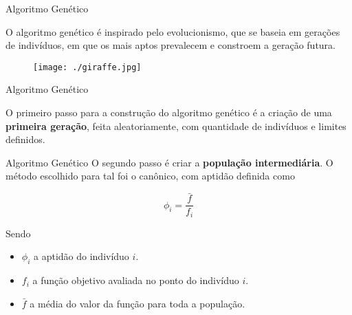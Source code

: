 \begin{frame}[t]{Algoritmo Genético}
	
	O algoritmo genético é inspirado pelo evolucionismo, que se baseia em gerações de indivíduos, em que os mais aptos prevalecem e constroem a geração futura.
	
	\begin{figure}[h]
		\begin{center}
			\texttt{[image: ./giraffe.jpg]}   
		\end{center}
	\end{figure}
	
\end{frame}

\begin{frame}[t]{Algoritmo Genético}
	
	O primeiro passo para a construção do algoritmo genético é a criação de uma \textbf{primeira geração}, feita aleatoriamente, com quantidade de indivíduos e limites definidos.
	
		\begin{center}
		\end{center}
	
\end{frame}
	
\begin{frame}[t]{Algoritmo Genético}
	O segundo passo é criar a \textbf{população intermediária}. O método escolhido para tal foi o canônico, com aptidão definida como 
	
	\begin{equation*}
		\phi_i = \dfrac{\bar{f}}{f_i}
	\end{equation*}
	
	Sendo
	\begin{itemize}
		\item $ \phi_i $ a aptidão do indivíduo $ i $.
		\item $ f_i $ a função objetivo avaliada no ponto do indivíduo $ i $.
		\item $ \bar{f} $ a média do valor da função para toda a população.
	\end{itemize} 
	
\end{frame}

